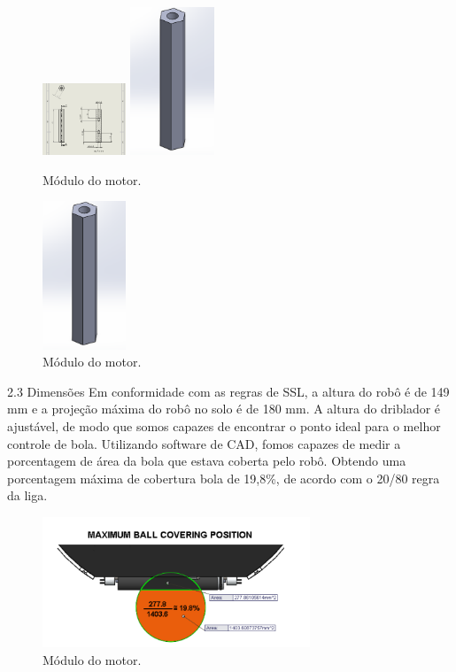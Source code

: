 \documentclass[letterpaper, 10 pt, conference]{ieeeconf}  %
\begin{document}
\begin{figure}[thpb]	
	\includegraphics[width=2.5cm]{img/mec8}
	\includegraphics[width=2.5cm]{img/mec9}
	\caption{Módulo do motor.}
	\label{img:modulomotor}
\end{figure}
\begin{figure}[thpb]	
	\includegraphics[width=2.5cm]{img/mec9}
	\caption{Módulo do motor.}
	\label{img:modulomotor}
\end{figure}
2.3 Dimensões
Em conformidade com as regras de SSL, a altura do robô é de 149 mm e a projeção máxima do
robô no solo é de 180 mm. A altura do driblador é ajustável, de modo que somos capazes de
encontrar o ponto ideal para o melhor controle de bola. Utilizando software de CAD, fomos
capazes de medir a porcentagem de área da bola que estava coberta pelo robô. Obtendo uma
porcentagem máxima de cobertura bola de 19,8\%, de acordo com o 20/80 regra da liga.
\begin{figure}[thpb]	
	\centering
	\includegraphics[width=8cm]{img/mec10}
	\caption{Módulo do motor.}
	\label{img:modulomotor}
\end{figure}
\end{document}
